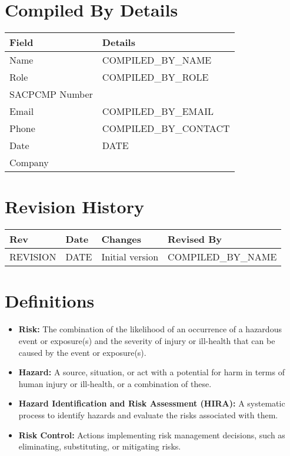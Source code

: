 \documentclass[11pt]{article}
\newcommand{\issueDate}{{{DATE}}}
\newcommand{\compilerName}{{{COMPILED_BY_NAME}}}
\newcommand{\compilerRole}{{{COMPILED_BY_ROLE}}}
\newcommand{\compilerSACPCMP}{}
\newcommand{\compilerEmail}{{{COMPILED_BY_EMAIL}}}
\newcommand{\compilerPhone}{{{COMPILED_BY_CONTACT}}}
\newcommand{\compilerCompany}{}
\newcommand{\revision}{{{REVISION}}}
\begin{document}
\section{Compiled By Details}
\begin{tabularx}{\textwidth}{lX}
  \toprule
  \textbf{Field} & \textbf{Details} \\
  \midrule
  Name & \compilerName \\
  Role & \compilerRole \\
  SACPCMP Number & \compilerSACPCMP \\
  Email & \compilerEmail \\
  Phone & \compilerPhone \\
  Date & \issueDate \\
  Company & \compilerCompany \\
  \bottomrule
\end{tabularx}

\section{Revision History}
\begin{tabularx}{\textwidth}{lXll}
  \toprule
  \textbf{Rev} & \textbf{Date} & \textbf{Changes} & \textbf{Revised By} \\
  \midrule
  \revision & \issueDate & Initial version & \compilerName \\
  \bottomrule
\end{tabularx}

\section{Definitions}
\begin{itemize}
    \item \textbf{Risk:} The combination of the likelihood of an occurrence of a hazardous event or exposure(s) and the severity of injury or ill-health that can be caused by the event or exposure(s).
    \item \textbf{Hazard:} A source, situation, or act with a potential for harm in terms of human injury or ill-health, or a combination of these.
    \item \textbf{Hazard Identification and Risk Assessment (HIRA):} A systematic process to identify hazards and evaluate the risks associated with them.
    \item \textbf{Risk Control:} Actions implementing risk management decisions, such as eliminating, substituting, or mitigating risks.
\end{itemize}
\end{document}
